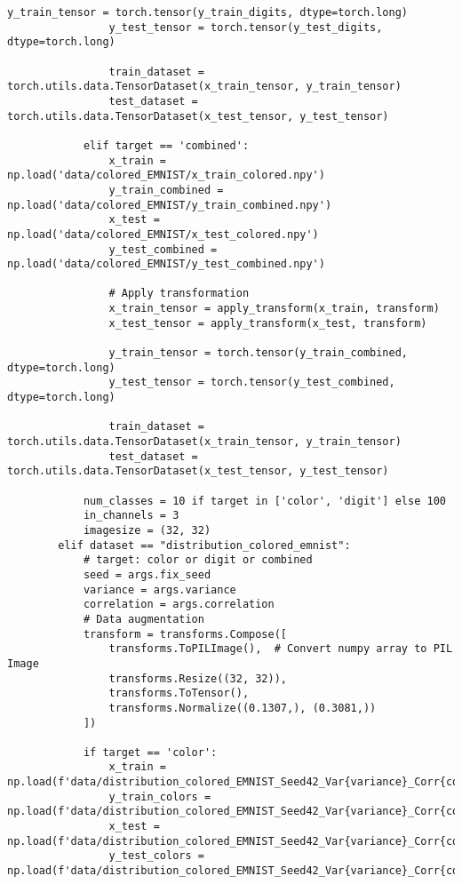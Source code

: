 \begin{lstlisting}[style=pythonstyle, caption={メインコード}]
                y_train_tensor = torch.tensor(y_train_digits, dtype=torch.long)
                y_test_tensor = torch.tensor(y_test_digits, dtype=torch.long)
                
                train_dataset = torch.utils.data.TensorDataset(x_train_tensor, y_train_tensor)
                test_dataset = torch.utils.data.TensorDataset(x_test_tensor, y_test_tensor)
                
            elif target == 'combined':
                x_train = np.load('data/colored_EMNIST/x_train_colored.npy')
                y_train_combined = np.load('data/colored_EMNIST/y_train_combined.npy')
                x_test = np.load('data/colored_EMNIST/x_test_colored.npy')
                y_test_combined = np.load('data/colored_EMNIST/y_test_combined.npy')
                
                # Apply transformation
                x_train_tensor = apply_transform(x_train, transform)
                x_test_tensor = apply_transform(x_test, transform)
                
                y_train_tensor = torch.tensor(y_train_combined, dtype=torch.long)
                y_test_tensor = torch.tensor(y_test_combined, dtype=torch.long)
                
                train_dataset = torch.utils.data.TensorDataset(x_train_tensor, y_train_tensor)
                test_dataset = torch.utils.data.TensorDataset(x_test_tensor, y_test_tensor)
                
            num_classes = 10 if target in ['color', 'digit'] else 100
            in_channels = 3
            imagesize = (32, 32)
        elif dataset == "distribution_colored_emnist":
            # target: color or digit or combined
            seed = args.fix_seed
            variance = args.variance
            correlation = args.correlation
            # Data augmentation
            transform = transforms.Compose([
                transforms.ToPILImage(),  # Convert numpy array to PIL Image
                transforms.Resize((32, 32)),
                transforms.ToTensor(),
                transforms.Normalize((0.1307,), (0.3081,))
            ])
            
            if target == 'color':
                x_train = np.load(f'data/distribution_colored_EMNIST_Seed42_Var{variance}_Corr{correlation}/x_train_colored.npy')
                y_train_colors = np.load(f'data/distribution_colored_EMNIST_Seed42_Var{variance}_Corr{correlation}/y_train_colors.npy')
                x_test = np.load(f'data/distribution_colored_EMNIST_Seed42_Var{variance}_Corr{correlation}/x_test_colored.npy')
                y_test_colors = np.load(f'data/distribution_colored_EMNIST_Seed42_Var{variance}_Corr{correlation}/y_test_colors.npy')
                

\end{lstlisting}
